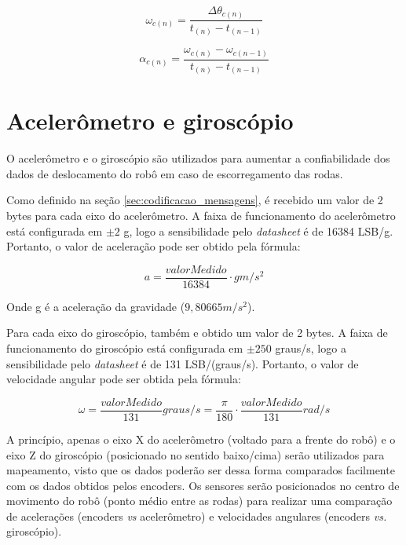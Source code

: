 \begin{equation}
  \omega_{c (n)} = \frac{\Delta \theta_{c (n)} }{t_{(n)} - t_{(n-1)}}
  \label{eq:omega_encoders}
\end{equation}

\begin{equation}
  \alpha_{c (n)} = \frac{\omega_{c (n)} - \omega_{c (n-1)}}{t_{(n)} - t_{(n-1)}}
  \label{eq:alpha_encoders}
\end{equation}


\section{Acelerômetro e giroscópio}
\label{sec:teoria_acel_giro}

O acelerômetro e o giroscópio são utilizados para aumentar a confiabilidade dos dados de deslocamento do robô em caso de escorregamento das rodas.



Como definido na seção \ref{sec:codificacao_mensagens}, é recebido um valor de 2 bytes para cada eixo do acelerômetro. A faixa de funcionamento do acelerômetro está configurada em $\pm 2$ g, logo a sensibilidade pelo \textit{datasheet} é de 16384 LSB/g. Portanto, o valor de aceleração pode ser obtido pela fórmula:

\begin{equation}
  a = \frac{valorMedido}{16384} \cdot g \unit{m/s^2}
  \label{eq:acel}
\end{equation}

Onde g é a aceleração da gravidade ($9,80665 \unit{m/s^2}$). 

Para cada eixo do giroscópio, também e obtido um valor de 2 bytes. A faixa de funcionamento do giroscópio está configurada em $\pm 250$ graus/s, logo a sensibilidade pelo \textit{datasheet} é de 131 LSB/(graus/s). Portanto, o valor de velocidade angular pode ser obtida pela fórmula:

\begin{equation}
  \omega = \frac{valorMedido}{131} \unit{graus/s} = \frac{\pi}{180} \cdot \frac{valorMedido}{131} \unit{rad/s}
  \label{eq:giro}
\end{equation}


A princípio, apenas o eixo X do acelerômetro (voltado para a frente do robô) e o eixo Z do giroscópio (posicionado no sentido baixo/cima) serão utilizados para mapeamento, visto que os dados poderão ser dessa forma comparados facilmente com os dados obtidos pelos encoders. Os sensores serão posicionados no centro de movimento do robô (ponto médio entre as rodas) para realizar uma comparação de acelerações (encoders \textit{vs} acelerômetro) e velocidades angulares (encoders \textit{vs.} giroscópio).

